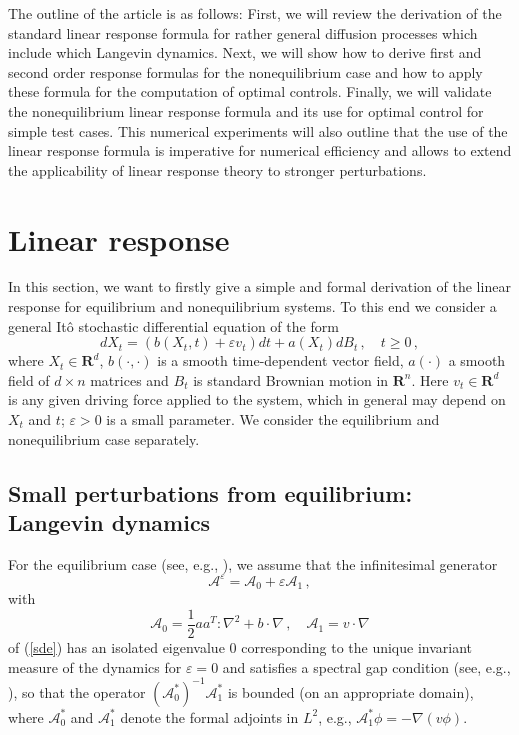 \documentclass[]{tMPH2e}
\newcommand{\R}{{\mathbf R}}
\newcommand{\eps}{\varepsilon}
\newcommand{\fwg}{{\mathcal A}}
\newcommand{\cA}{\mathcal A}
\begin{document}
The outline of the article is as follows: First, we will review the derivation of the standard linear response formula for  rather general diffusion processes which include which Langevin dynamics. Next, we will show how to derive first and second order response formulas for the nonequilibrium case and how to apply these formula for the computation of optimal controls. Finally, we will validate the nonequilibrium linear response formula and its use for optimal control for simple test cases. This numerical experiments will also outline that the use of the linear response formula is imperative for numerical efficiency and allows to extend the applicability of linear response theory to stronger perturbations. 


 


\section{Linear response}


In this section, we want to firstly give a simple and formal derivation of the linear response for equilibrium and nonequilibrium systems. To this end we consider a general It\^o stochastic differential equation of the form
\begin{equation}\label{sde}
dX_{t} = (b(X_{t},t) + \eps v_{t})dt +a(X_{t})dB_{t}\,,\quad t\ge 0\,,
\end{equation}
where $X_{t}\in\R^{d}$, $b(\cdot,\cdot)$ is a smooth time-dependent vector field, $a(\cdot)$ a smooth field of $d\times n$ matrices and $B_{t}$ is standard Brownian motion in $\R^{n}$. Here $v_{t}\in\R^{d}$ is any given driving force applied to the system, which in general may depend on $X_{t}$ and $t$; $\eps>0$ is a small parameter. We consider the equilibrium and nonequilibrium case separately. 


  




\subsection{Small perturbations from equilibrium: Langevin dynamics}

For the equilibrium case (see, e.g., \cite{XXX,YYY,ZZZ}), we assume that the infinitesimal generator
\[
\fwg^{\eps} = \fwg_{0} + \eps\fwg_{1}\,, 
\]
with 
\[
\fwg_{0} = \frac{1}{2}aa^{T}\colon\nabla^{2} + b\cdot\nabla\,,\quad \fwg_{1}=v\cdot\nabla 
\]
of (\ref{sde}) has an isolated eigenvalue 0 corresponding to the unique invariant measure of the dynamics for $\eps=0$ and satisfies a spectral gap condition (see, e.g., \cite{stoltz2012}), so that the operator $(\fwg_{0}^{*})^{-1}\fwg_{1}^{*}$ is bounded (on an appropriate domain), where $\cA_{0}^{*}$ and $\cA_{1}^{*}$ denote the formal adjoints in $L^{2}$, e.g., $\cA_{1}^{*}\phi=-\nabla(v \phi)$.  
\end{document}
